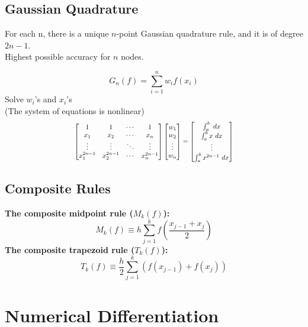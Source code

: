 \documentclass[9pt]{article}
\begin{document}
\begin{multicols}{3}
\hdashrule{\linewidth}{0.5pt}{1mm 1mm}
\vspace{-0.8cm}
\subsection*{Gaussian Quadrature}
For each n, there is a unique $n$-point Gaussian quadrature rule, and it is of degree $2n-1$. \\
Highest possible accuracy for $n$ nodes.

\[
G_n(f) = \sum_{i=1}^n w_i f(x_i)
\]
Solve $w_i$'s and $x_i$'s\\(The system of equations is nonlinear)
\[
\scalebox{0.8}{$
\begin{bmatrix}
    1 & 1 & \cdots & 1\\
    x_1 & x_2 & \cdots & x_n\\
    \vdots & \vdots & \ddots & \vdots\\
    x_1^{2n-1} & x_2^{2n-1} & \cdots & x_n^{2n-1}
\end{bmatrix}
\begin{bmatrix}
    w_1\\
    w_2\\
    \vdots\\
    w_n
\end{bmatrix}
=
\begin{bmatrix}
    \int_a^b \ dx\\
    \int_a^b x \ dx\\
    \vdots\\
    \int_a^b x^{2n-1} \ dx
\end{bmatrix}
$}
\]

\vspace{0.1cm}
\hdashrule{\linewidth}{0.5pt}{1mm 1mm}
\vspace{-0.7cm}
\subsection*{Composite Rules}
\textbf{The composite midpoint rule ($M_k(f)$):}
\[
M_k(f) \equiv h \sum_{j=1}^k f \left( \frac{x_{j-1}  + x_j}{2} \right)
\]
\textbf{The composite trapezoid rule ($T_k(f)$):}
\[
T_k(f) \equiv \frac{h}{2} \sum_{j=1}^k \left( f(x_{j-1}) + f(x_j) \right)
\]

\columnbreak
\section{Numerical Differentiation}


\end{multicols}
\end{document}
